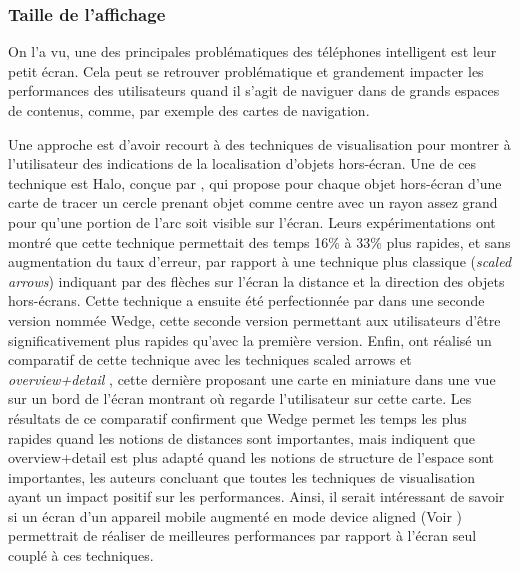 

\subsubsection*{Taille de l'affichage}
On l'a vu, une des principales problématiques des téléphones intelligent est leur petit écran. Cela peut se retrouver problématique et grandement impacter les performances des utilisateurs quand il s'agit de naviguer dans de grands espaces de contenus, comme, par exemple des cartes de navigation.

Une approche est d'avoir recourt à des techniques de visualisation pour montrer à l'utilisateur des indications de la localisation d'objets hors-écran. Une de ces technique est Halo, conçue par \citet{BaudischRosenholtz2003}, qui propose pour chaque objet hors-écran d'une carte de tracer un cercle prenant objet comme centre avec un rayon assez grand pour qu'une portion de l'arc soit visible sur l'écran. Leurs expérimentations ont montré que cette technique permettait des temps 16\% à 33\% plus rapides, et sans augmentation du taux d'erreur, par rapport à une technique plus classique (\emph{scaled arrows}) indiquant par des flèches sur l'écran la distance et la direction des objets hors-écrans. Cette technique a ensuite été perfectionnée par \citet{GustafsonBaudischGutwinEtAl2008} dans une seconde version nommée Wedge, cette seconde version permettant aux utilisateurs d'être significativement plus rapides qu'avec la première version. Enfin, \citet{BurigatChittaro2011} ont réalisé un comparatif de cette technique avec les techniques \foreignlanguage{english}{scaled arrows} et \emph{overview+detail} , cette dernière proposant une carte en miniature dans une vue sur un bord de l'écran montrant où regarde l'utilisateur sur cette carte. Les résultats de ce comparatif confirment que Wedge permet les temps les plus rapides quand les notions de distances sont importantes, mais indiquent que overview+detail est plus adapté quand les notions de structure de l'espace sont importantes, les auteurs concluant que toutes les techniques de visualisation ayant un impact positif sur les performances. Ainsi, il serait intéressant de savoir si un écran d'un appareil mobile augmenté en mode \foreignlanguage{english}{device aligned} (Voir \cite{GrubertKranzQuigley2015}) permettrait de réaliser de meilleures performances par rapport à l'écran seul couplé à ces techniques.

